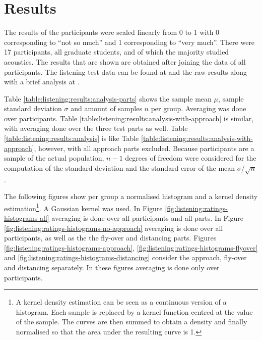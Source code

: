 \newpage
\section{Results}
The results of the participants were scaled linearly from 0 to 1 with 0
corresponding to ``not so much'' and 1 corresponding to ``very much''.
There were 17 participants, all graduate students, and of which the majority
studied acoustics. The results that are shown are obtained after joining the
data of all participants. %
The listening test data can be found at \cite{Rietdijk2017a} and the
raw results along with a brief analysis at \cite{Rietdijk2017b}.

Table \ref{table:listening:results:analysis-parts} shows the sample mean $\mu$,
sample standard deviation $\sigma$ and amount of samples $n$ per group. Averaging was
done over participants. Table
\ref{table:listening:results:analysis-with-approach} is similar, with averaging
done over the three test parts as well. Table
\ref{table:listening:results:analysis} is like Table
\ref{table:listening:results:analysis-with-approach}, however, with all approach
parts excluded. Because participants are a sample of the actual
population, $n-1$ degrees of freedom were considered for the computation of the
standard deviation and the standard error of the mean $\sigma/\sqrt{n}$.

The following figures show per group a normalised histogram and a kernel density estimation\footnote{ A kernel density estimation can be seen as a continuous version
of a histogram. Each sample is replaced by a kernel function centred at the
value of the sample. The curves are then summed to obtain a density and finally
normalised so that the area under the resulting curve is 1. }. A Gaussian kernel
was used.
In Figure \ref{fig:listening:ratings-histograms-all} averaging is done over all participants and all parts.
In Figure \ref{fig:listening:ratings-histograms-no-approach} averaging is done over all participants, as well as the the fly-over and distancing parts.
Figures \ref{fig:listening:ratings-histograms-approach}, \ref{fig:listening:ratings-histograms-flyover} and \ref{fig:listening:ratings-histograms-distancing}
consider the approach, fly-over and distancing separately. In these figures averaging is done only over participants.

